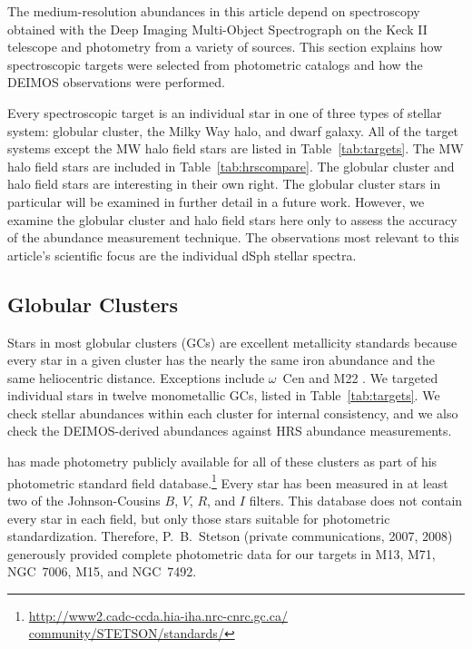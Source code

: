 \documentclass{emulateapj}
\begin{document}
The medium-resolution abundances in this article depend on
spectroscopy obtained with the Deep Imaging Multi-Object Spectrograph
\citep[DEIMOS,][]{fab03} on the Keck II telescope and photometry from
a variety of sources.  This section explains how spectroscopic targets
were selected from photometric catalogs and how the DEIMOS
observations were performed.

Every spectroscopic target is an individual star in one of three types
of stellar system: globular cluster, the Milky Way halo, and dwarf
galaxy.  All of the target systems except the MW halo field stars are
listed in Table~\ref{tab:targets}.  The MW halo field stars are
included in Table~\ref{tab:hrscompare}.  The globular cluster and halo
field stars are interesting in their own right.  The globular cluster
stars in particular will be examined in further detail in a future
work.  However, we examine the globular cluster and halo field stars
here only to assess the accuracy of the abundance measurement
technique.  The observations most relevant to this article's
scientific focus are the individual dSph stellar spectra.

\subsection{Globular Clusters}
\label{sec:gcobs}

Stars in most globular clusters (GCs) are excellent metallicity
standards because every star in a given cluster has the nearly the
same iron abundance and the same heliocentric distance.  Exceptions
include $\omega$~Cen \citep{fre75} and M22 \citep{dac09,mar09}.  We
targeted individual stars in twelve monometallic GCs, listed in
Table~\ref{tab:targets}.  We check stellar abundances within each
cluster for internal consistency, and we also check the DEIMOS-derived
abundances against HRS abundance measurements.

\citet{ste00} has made photometry publicly available for all of these
clusters as part of his photometric standard field
database.\footnote{\url{http://www2.cadc-ccda.hia-iha.nrc-cnrc.gc.ca/}
  \url{community/STETSON/standards/}} Every star has been measured in
at least two of the Johnson-Cousins $B$, $V$, $R$, and $I$ filters.
This database does not contain every star in each field, but only
those stars suitable for photometric standardization.  Therefore,
P.~B.~Stetson (private communications, 2007, 2008) generously provided
complete photometric data for our targets in M13, M71, NGC~7006, M15,
and NGC~7492.
\end{document}

